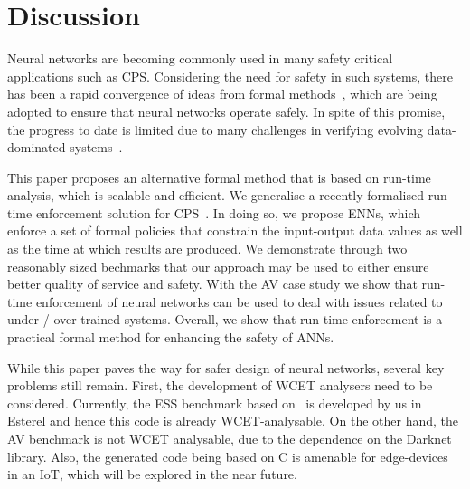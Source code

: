 \section{Discussion}

Neural networks are becoming commonly used in many  safety critical applications such as
\acf{CPS}. 
Considering the need for safety in such systems, there has been a rapid convergence of
ideas from formal methods~\cite{formal-methods}, which are being adopted to ensure
that neural networks operate safely. In spite of this promise, the progress to date is limited
due to many challenges in verifying evolving data-dominated systems~\cite{seshia2016towards}.

This paper proposes an alternative formal method that is based on run-time analysis, which is scalable and efficient. 
We generalise a recently formalised run-time enforcement solution for
CPS~\cite{theoryRE}. In doing so, we propose \acfp{ENN}, which enforce a set
of formal policies that constrain the
 input-output data values as well as the time at which results
are produced. We demonstrate through two
reasonably sized bechmarks that our approach may be used to
either ensure better quality of service and safety. 
With the
\acf{AV} case study we show that run-time enforcement of
neural networks can be used to deal with issues related to under
/ over-trained systems. Overall, we show that run-time enforcement is
a practical formal method for enhancing the safety of \acfp{ANN}.

While this paper paves the way for safer design of neural networks,
several key problems still remain. First, the development of \ac{WCET}
analysers 
need to be considered. Currently, the \ac{ESS} benchmark based on~\cite{chaudhari2017hybrid} is
developed by us in Esterel and hence this code is already
WCET-analysable. On the other hand, the \ac{AV} benchmark is not
\ac{WCET} analysable, due to the dependence on the Darknet library.
 Also, the generated code being based on C is amenable for
 edge-devices in an IoT, which will be
explored in the near future.

